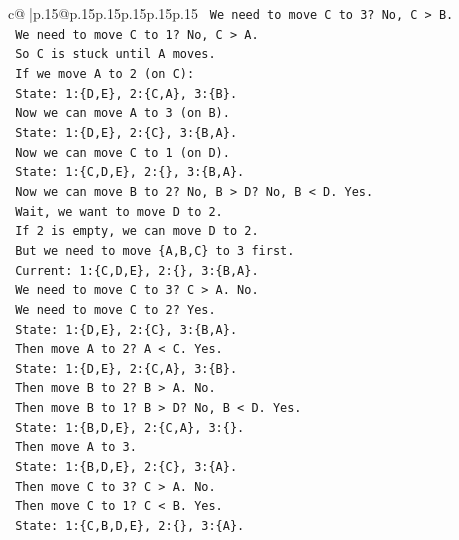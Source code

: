 \documentclass{article}
\begin{document}
{\begin{supertabular}{c@{$\;$}|p{.15\linewidth}@{}p{.15\linewidth}p{.15\linewidth}p{.15\linewidth}p{.15\linewidth}p{.15\linewidth}}
{{{\texttt{        We need to move C to 3? No, C > B.} \\
\texttt{        We need to move C to 1? No, C > A.} \\
\texttt{        So C is stuck until A moves.} \\
\texttt{        If we move A to 2 (on C):} \\
\texttt{          State: 1:\{D,E\}, 2:\{C,A\}, 3:\{B\}.} \\
\texttt{          Now we can move A to 3 (on B).} \\
\texttt{          State: 1:\{D,E\}, 2:\{C\}, 3:\{B,A\}.} \\
\texttt{          Now we can move C to 1 (on D).} \\
\texttt{          State: 1:\{C,D,E\}, 2:\{\}, 3:\{B,A\}.} \\
\texttt{          Now we can move B to 2? No, B > D? No, B < D. Yes.} \\
\texttt{          Wait, we want to move D to 2.} \\
\texttt{          If 2 is empty, we can move D to 2.} \\
\texttt{          But we need to move \{A,B,C\} to 3 first.} \\
\texttt{          Current: 1:\{C,D,E\}, 2:\{\}, 3:\{B,A\}.} \\
\texttt{          We need to move C to 3? C > A. No.} \\
\texttt{          We need to move C to 2? Yes.} \\
\texttt{          State: 1:\{D,E\}, 2:\{C\}, 3:\{B,A\}.} \\
\texttt{          Then move A to 2? A < C. Yes.} \\
\texttt{          State: 1:\{D,E\}, 2:\{C,A\}, 3:\{B\}.} \\
\texttt{          Then move B to 2? B > A. No.} \\
\texttt{          Then move B to 1? B > D? No, B < D. Yes.} \\
\texttt{          State: 1:\{B,D,E\}, 2:\{C,A\}, 3:\{\}.} \\
\texttt{          Then move A to 3.} \\
\texttt{          State: 1:\{B,D,E\}, 2:\{C\}, 3:\{A\}.} \\
\texttt{          Then move C to 3? C > A. No.} \\
\texttt{          Then move C to 1? C < B. Yes.} \\
\texttt{          State: 1:\{C,B,D,E\}, 2:\{\}, 3:\{A\}.} \\
}}}
\end{supertabular}}
\end{document}

